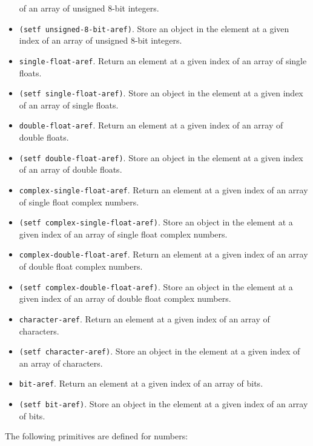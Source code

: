 \begin{itemize}
  of an array of unsigned 8-bit integers.
\item \texttt{(setf unsigned-8-bit-aref)}.  Store an object in the
  element at a given index of an array of unsigned 8-bit integers.
\item \texttt{single-float-aref}.  Return an element at a given index
  of an array of single floats.
\item \texttt{(setf single-float-aref)}.  Store an object in the
  element at a given index of an array of single floats.
\item \texttt{double-float-aref}.  Return an element at a given index
  of an array of double floats.
\item \texttt{(setf double-float-aref)}.  Store an object in the
  element at a given index of an array of double floats.
\item \texttt{complex-single-float-aref}.  Return an element at a given
  index of an array of single float complex numbers.
\item \texttt{(setf complex-single-float-aref)}.  Store an object in
  the element at a given index of an array of single float complex
  numbers.
\item \texttt{complex-double-float-aref}.  Return an element at a given
  index of an array of double float complex numbers.
\item \texttt{(setf complex-double-float-aref)}.  Store an object in
  the element at a given index of an array of double float complex
  numbers.
\item \texttt{character-aref}.  Return an element at a given index of
  an array of characters.
\item \texttt{(setf character-aref)}.  Store an object in the element
  at a given index of an array of characters.
\item \texttt{bit-aref}.  Return an element at a given index of an
  array of bits.
\item \texttt{(setf bit-aref)}.  Store an object in the element at a
  given index of an array of bits.
\end{itemize}

The following primitives are defined for numbers:


